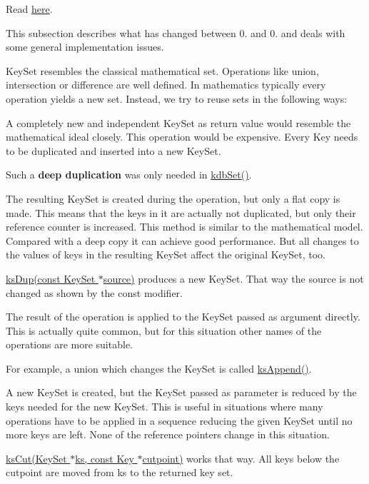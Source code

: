 Read \hyperlink{doc_dev_metadata_md}{here}.

This subsection describes what has changed between 0. and 0. and deals with some general implementation issues.

{\ttfamily Key\+Set} resembles the classical mathematical set. Operations like union, intersection or difference are well defined. In mathematics typically every operation yields a new set. Instead, we try to reuse sets in the following ways\+:


\begin{DoxyItemize}
\item A completely new and independent {\ttfamily Key\+Set} as return value would resemble the mathematical ideal closely. This operation would be expensive. Every {\ttfamily Key} needs to be duplicated and inserted into a new {\ttfamily Key\+Set}.

Such a {\bfseries deep duplication} was only needed in {\ttfamily \hyperlink{group__kdb_ga11436b058408f83d303ca5e996832bcf}{kdb\+Set()}}.
\item The resulting {\ttfamily Key\+Set} is created during the operation, but only a flat copy is made. This means that the keys in it are actually not duplicated, but only their reference counter is increased. This method is similar to the mathematical model. Compared with a deep copy it can achieve good performance. But all changes to the values of keys in the resulting {\ttfamily Key\+Set} affect the original {\ttfamily Key\+Set}, too.

{\ttfamily \hyperlink{group__keyset_gac59e4b328245463f1451f68d5106151c}{ks\+Dup(const Key\+Set $\ast$source)}} produces a new {\ttfamily Key\+Set}. That way the {\ttfamily source} is not changed as shown by the {\ttfamily const} modifier.
\item The result of the operation is applied to the {\ttfamily Key\+Set} passed as argument directly. This is actually quite common, but for this situation other names of the operations are more suitable.

For example, a union which changes the {\ttfamily Key\+Set} is called {\ttfamily \hyperlink{group__keyset_ga21eb9c3a14a604ee3a8bdc779232e7b7}{ks\+Append()}}.
\item A new {\ttfamily Key\+Set} is created, but the {\ttfamily Key\+Set} passed as parameter is reduced by the keys needed for the new {\ttfamily Key\+Set}. This is useful in situations where many operations have to be applied in a sequence reducing the given {\ttfamily Key\+Set} until no more keys are left. None of the reference pointers change in this situation.

{\ttfamily \hyperlink{group__keyset_ga6b00cf82b59af4d883a9bad6cf4a4a4a}{ks\+Cut(\+Key\+Set $\ast$ks, const Key $\ast$cutpoint)}} works that way. All keys below the {\ttfamily cutpoint} are moved from {\ttfamily ks} to the returned key set.
\end{DoxyItemize}

